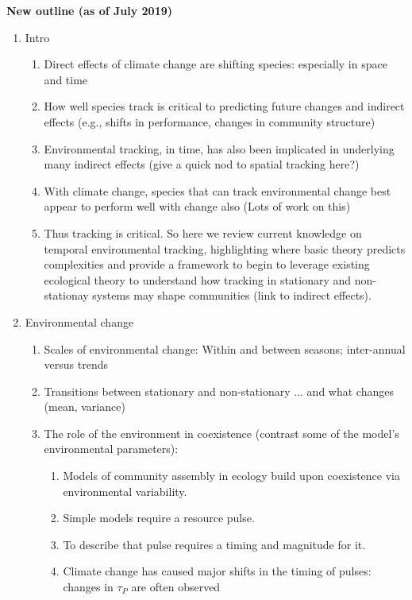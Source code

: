 \documentclass[11pt,letterpaper]{article}
\begin{document}
\begin{enumerate}

\end{enumerate}


{\bf New outline (as of July 2019)} 
\begin{enumerate}
\item Intro
\begin{enumerate}
\item Direct effects of climate change are shifting species: especially in space and time 
\item How well species track is critical to predicting future changes and indirect effects (e.g., shifts in performance, changes in community structure) 
\item Environmental tracking, in time, has also been implicated in underlying many indirect effects (give a quick nod to spatial tracking here?)
\item With climate change, species that can track environmental change best appear to perform well with change also (Lots of work on this)
\item Thus tracking is critical. So here we review current knowledge on temporal environmental tracking, highlighting where basic theory predicts complexities and provide a framework to begin to leverage existing ecological theory to understand how tracking in stationary and non-stationay systems may shape communities (link to indirect effects).
\end{enumerate}
\item Environmental change
\begin{enumerate}
\item Scales of environmental change: Within and between seasons; inter-annual versus trends
\item Transitions between stationary and non-stationary ... and what changes (mean, variance) 
\item The role of the environment in coexistence (contrast some of the model's environmental parameters):
\begin{enumerate}
\item Models of community assembly in ecology build upon coexistence via environmental variability. %
\item Simple models require a resource pulse. 
\item To describe that pulse requires a timing and magnitude for it.  %
\item Climate change has caused major shifts in the timing of pulses: changes in $\tau_{P}$ are often observed 

\end{enumerate}
\end{enumerate}
\end{enumerate}
\end{document}
